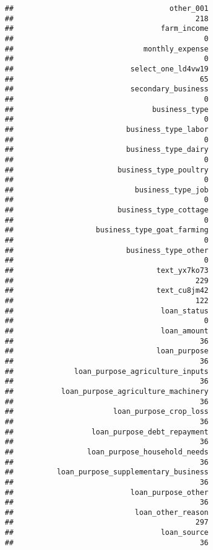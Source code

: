\documentclass[
]{article}
\begin{document}
\begin{verbatim}
##                                    other_001 
##                                          218 
##                                  farm_income 
##                                            0 
##                              monthly_expense 
##                                            0 
##                           select_one_ld4vw19 
##                                           65 
##                           secondary_business 
##                                            0 
##                                business_type 
##                                            0 
##                          business_type_labor 
##                                            0 
##                          business_type_dairy 
##                                            0 
##                        business_type_poultry 
##                                            0 
##                            business_type_job 
##                                            0 
##                        business_type_cottage 
##                                            0 
##                   business_type_goat_farming 
##                                            0 
##                          business_type_other 
##                                            0 
##                                 text_yx7ko73 
##                                          229 
##                                 text_cu8jm42 
##                                          122 
##                                  loan_status 
##                                            0 
##                                  loan_amount 
##                                           36 
##                                 loan_purpose 
##                                           36 
##              loan_purpose_agriculture_inputs 
##                                           36 
##           loan_purpose_agriculture_machinery 
##                                           36 
##                       loan_purpose_crop_loss 
##                                           36 
##                  loan_purpose_debt_repayment 
##                                           36 
##                 loan_purpose_household_needs 
##                                           36 
##          loan_purpose_supplementary_business 
##                                           36 
##                           loan_purpose_other 
##                                           36 
##                            loan_other_reason 
##                                          297 
##                                  loan_source 
##                                           36 

\end{verbatim}
\end{document}
